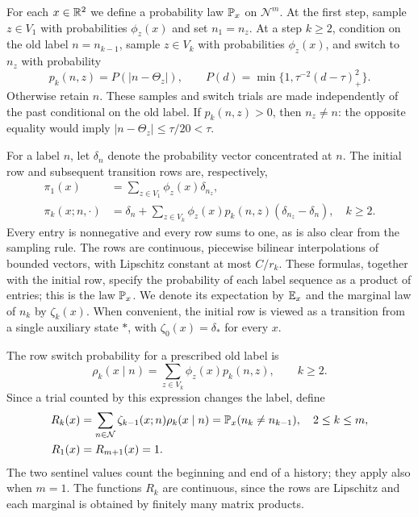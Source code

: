 For each $x\in\mathbb R^2$ we define a probability law $\mathbb P_x$ on
$\mathcal N^m$. At the first step, sample $z\in V_1$ with probabilities
$\phi_z(x)$ and set $n_1=n_z$. At a step $k\ge2$, condition on the old
label $n=n_{k-1}$, sample $z\in V_k$ with probabilities $\phi_z(x)$,
and switch to $n_z$ with probability
\begin{equation}
 p_k(n,z)=P(|n-\Theta_z|),
 \qquad
 P(d)=\min\{1,\tau^{-2}(d-\tau)_+^2\}.
 \label{eq:labels-switch-function}
\end{equation}
Otherwise retain $n$. These samples and switch trials are made independently
of the past conditional on the old label. If $p_k(n,z)>0$, then $n_z\ne n$:
the opposite equality would imply $|n-\Theta_z|\le\tau/20<\tau$.

For a label $n$, let $\delta_n$ denote the probability vector concentrated
at $n$. The initial row and subsequent transition rows are, respectively,
\begin{align}
 \pi_1(x)
 &=\sum_{z\in V_1}\phi_z(x)\delta_{n_z},
 \label{eq:labels-initial-row}\\
 \pi_k(x;n,\cdot)
 &=\delta_n+\sum_{z\in V_k}\phi_z(x)p_k(n,z)
                              (\delta_{n_z}-\delta_n),\quad k\ge2.
 \label{eq:labels-transition-row}
\end{align}
Every entry is nonnegative and every row sums to one, as is also clear
from the sampling rule. The rows are continuous, piecewise bilinear
interpolations of bounded vectors, with Lipschitz constant at most
$C/r_k$. These formulas, together with the initial row,
specify the probability of each label sequence as a product of entries;
this is the law $\mathbb P_x$. We denote its expectation by $\mathbb E_x$ and the
marginal law of $n_k$ by $\zeta_k(x)$. When convenient, the initial row is
viewed as a transition from a single auxiliary state $*$, with
$\zeta_0(x)=\delta_*$ for every $x$.

The row switch probability for a prescribed old label is
\[
 \rho_k(x\mid n)=\sum_{z\in V_k}\phi_z(x)p_k(n,z),\qquad k\ge2.
\]
Since a trial counted by this expression changes the label, define
\begin{equation}
 \begin{aligned}
 R_k(x)&=\sum_{n\in\mathcal N}\zeta_{k-1}(x;n)\rho_k(x\mid n)
       =\mathbb P_x(n_k\ne n_{k-1}),\quad 2\le k\le m,\\
 R_1(x)&=R_{m+1}(x)=1.
 \end{aligned}
 \label{eq:labels-switch-rates}
\end{equation}
The two sentinel values count the beginning and end of a history;
they apply also when $m=1$. The functions $R_k$ are continuous, since
the rows are Lipschitz and each marginal is obtained by finitely many
matrix products.

